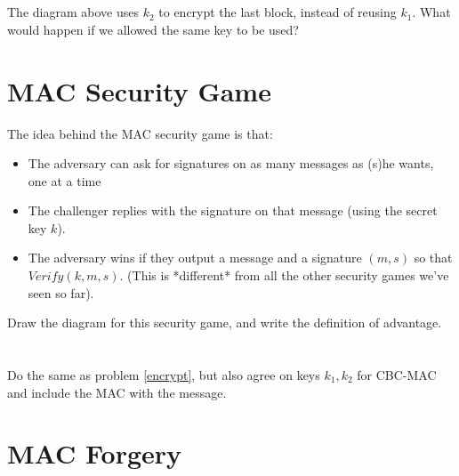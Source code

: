 \documentclass[12pt]{article}
\begin{document}
\section{}

The diagram above uses $k_2$ to encrypt the last block, instead of reusing $k_1$. What would happen if we allowed the same key to be used?


\section{MAC Security Game}

The idea behind the MAC security game is that:

\begin{itemize}
\item The adversary can ask for signatures on as many messages as (s)he wants, one at a time
\item The challenger replies with the signature on that message (using the secret key $k$).
\item The adversary wins if they output a message and a signature $(m, s)$ so that $Verify(k, m, s)$. (This is *different* from all the other security games we've seen so far).
\end{itemize}

Draw the diagram for this security game, and write the definition of advantage.

\section{}

Do the same as problem \ref{encrypt}, but also agree on keys $k_1, k_2$ for CBC-MAC and include the MAC with the message.

\section{MAC Forgery}
\end{document}
